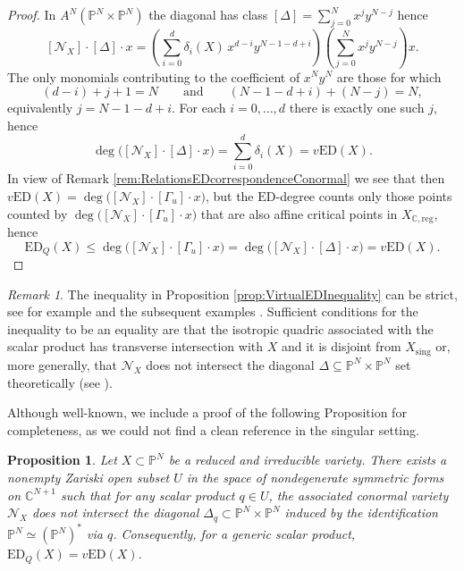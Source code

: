 \documentclass[11pt]{article}
\numberwithin{equation}{section}
\numberwithin{figure}{section}
\theoremstyle{plain}
\newtheorem{prop}[thm]{Proposition}
\theoremstyle{definition}
\theoremstyle{remark}
\newtheorem{rem}[thm]{Remark}
\newcommand{\su}{\subseteq}
\renewcommand{\P}{\mathbb{P}}
\newcommand{\ED}{\mathrm{ED}}
\newcommand{\vED}{v\mathrm{ED}}
\begin{document}
\begin{proof}
In $A^{N}(\mathbb P^N\times\mathbb P^N)$ the diagonal has class $[\Delta] = \sum_{j=0}^{N} x^{j}y^{N-j}$ hence
\[
[\mathcal N_X]\cdot[\Delta]\cdot x
=
\left(\sum_{i=0}^{d} \delta_i(X)\, x^{d-i} y^{N-1-d+i}\right)
\left(\sum_{j=0}^{N} x^{j}y^{N-j}\right)x.
\]
The only monomials contributing to the coefficient of $x^{N}y^{N}$ are those for which
\[
(d-i)+j+1 = N
\qquad\text{and}\qquad
(N-1-d+i)+(N-j)=N,
\]
equivalently $j=N-1-d+i$. For each $i=0,\dots,d$ there is exactly one such $j$, hence
\[
\deg\bigl([\mathcal N_X]\cdot[\Delta]\cdot x\bigr)
=
\sum_{i=0}^{d}\delta_i(X)
= \vED(X).
\]
In view of Remark \ref{rem:RelationsEDcorrespondenceConormal} we see that then $\vED(X)=\deg\bigl([\mathcal N_X]\cdot[\Gamma _u]\cdot x\bigr)$, but the $\ED$-degree counts only those points counted by $\deg\bigl([\mathcal N_X]\cdot[\Gamma _u]\cdot x\bigr)$ that are also affine critical points in $X_{\mathbb C,\mathrm{reg}}$, hence  
$$\ED_Q(X)\le \deg\bigl( [\mathcal N_X]\cdot [\Gamma_u] \cdot x\bigr) =\deg\bigl( [\mathcal N_X]\cdot [\Delta] \cdot x \bigr)= \vED(X).$$
\end{proof}

\begin{rem}\label{rem:Diagonal}
The inequality in Proposition \ref{prop:VirtualEDInequality} can be strict, see for example  \cite[Theorem 6.11]{DHOST} and the subsequent examples \cite[Examples 6.12, 6.13]{DHOST}. Sufficient conditions for the inequality to be an equality are that the isotropic quadric associated with the scalar product has transverse intersection with $X$ and it is disjoint from $X_\mathrm{sing}$ or, more generally, that $\mathcal N _X$ does not intersect the diagonal $\Delta\su\P^N \times\P^N$ set theoretically (see \cite[Theorem 5.4]{DHOST}).
\end{rem}

Although well-known, we include a proof of the following Proposition for completeness, as we could not find a clean reference in the singular setting.

\begin{prop}\label{prop:generalScalarProduct}
Let $X \subset \mathbb{P}^{N}$ be a reduced and irreducible variety. There exists a nonempty Zariski open subset $U$ in the space of nondegenerate symmetric forms on $\mathbb{C}^{N+1}$ such that for any scalar product $q \in U$, the associated conormal variety $\mathcal{N}_{X}$ does not intersect the diagonal $\Delta_{q} \subset \mathbb{P}^{N} \times \mathbb{P}^{N}$ induced by the identification $\mathbb{P}^{N} \simeq \left( \mathbb{P}^{N} \right)^{\ast}$ via $q$.
Consequently, for a generic scalar product, $\ED_Q\left( X \right) = \vED\left( X \right)$.
\end{prop}
\end{document}
